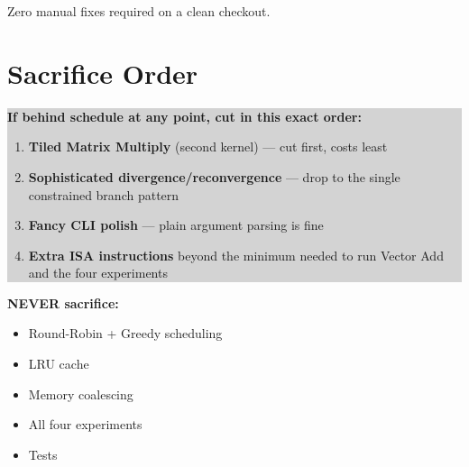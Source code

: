 \documentclass[11pt]{article}
\begin{document}
Zero manual fixes required on a clean checkout.

\section{Sacrifice Order}
\label{sec:sacrifice}

\begin{center}
\colorbox{lightgray}{\begin{minipage}{0.9\textwidth}
\centering
\vspace{0.3cm}
\textbf{\large If behind schedule at any point, cut in this exact order:}

\vspace{0.3cm}
\begin{enumerate}[leftmargin=2.5cm]
  \item \textbf{Tiled Matrix Multiply} (second kernel) --- cut first,
  costs least
  \item \textbf{Sophisticated divergence/reconvergence} --- drop to the
  single constrained branch pattern
  \item \textbf{Fancy CLI polish} --- plain argument parsing is fine
  \item \textbf{Extra ISA instructions} beyond the minimum needed to run
  Vector Add and the four experiments
\end{enumerate}
\vspace{0.2cm}
\end{minipage}}
\end{center}

\begin{center}
\colorbox{warnred!10}{\begin{minipage}{0.9\textwidth}
\centering
\vspace{0.2cm}
\textcolor{warnred}{\textbf{\large NEVER sacrifice:}}
\begin{itemize}[leftmargin=2.5cm]
  \item Round-Robin + Greedy scheduling
  \item LRU cache
  \item Memory coalescing
  \item All four experiments
  \item Tests
\end{itemize}
\vspace{0.2cm}
\end{minipage}}
\end{center}
\end{document}
